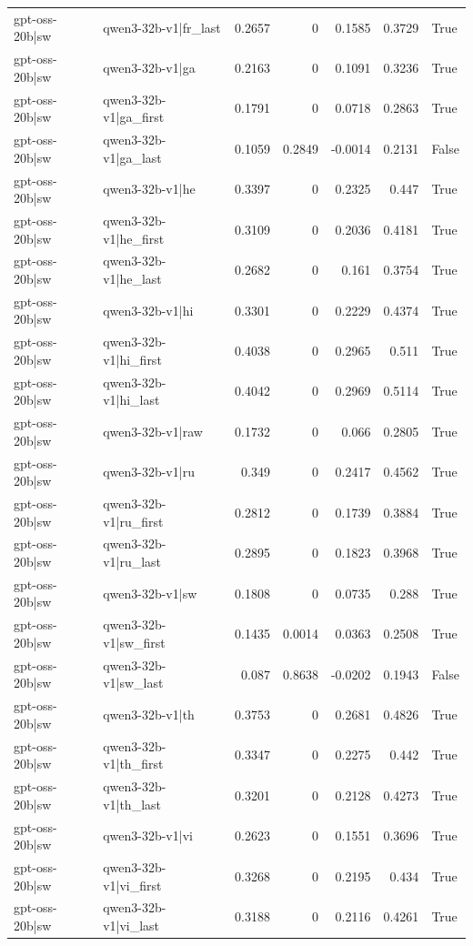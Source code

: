 \begin{table}
\begin{tabular}{l l r r r r l}
gpt-oss-20b|sw & qwen3-32b-v1|fr_last & 0.2657 & 0 & 0.1585 & 0.3729 & True \\
gpt-oss-20b|sw & qwen3-32b-v1|ga & 0.2163 & 0 & 0.1091 & 0.3236 & True \\
gpt-oss-20b|sw & qwen3-32b-v1|ga_first & 0.1791 & 0 & 0.0718 & 0.2863 & True \\
gpt-oss-20b|sw & qwen3-32b-v1|ga_last & 0.1059 & 0.2849 & -0.0014 & 0.2131 & False \\
gpt-oss-20b|sw & qwen3-32b-v1|he & 0.3397 & 0 & 0.2325 & 0.447 & True \\
gpt-oss-20b|sw & qwen3-32b-v1|he_first & 0.3109 & 0 & 0.2036 & 0.4181 & True \\
gpt-oss-20b|sw & qwen3-32b-v1|he_last & 0.2682 & 0 & 0.161 & 0.3754 & True \\
gpt-oss-20b|sw & qwen3-32b-v1|hi & 0.3301 & 0 & 0.2229 & 0.4374 & True \\
gpt-oss-20b|sw & qwen3-32b-v1|hi_first & 0.4038 & 0 & 0.2965 & 0.511 & True \\
gpt-oss-20b|sw & qwen3-32b-v1|hi_last & 0.4042 & 0 & 0.2969 & 0.5114 & True \\
gpt-oss-20b|sw & qwen3-32b-v1|raw & 0.1732 & 0 & 0.066 & 0.2805 & True \\
gpt-oss-20b|sw & qwen3-32b-v1|ru & 0.349 & 0 & 0.2417 & 0.4562 & True \\
gpt-oss-20b|sw & qwen3-32b-v1|ru_first & 0.2812 & 0 & 0.1739 & 0.3884 & True \\
gpt-oss-20b|sw & qwen3-32b-v1|ru_last & 0.2895 & 0 & 0.1823 & 0.3968 & True \\
gpt-oss-20b|sw & qwen3-32b-v1|sw & 0.1808 & 0 & 0.0735 & 0.288 & True \\
gpt-oss-20b|sw & qwen3-32b-v1|sw_first & 0.1435 & 0.0014 & 0.0363 & 0.2508 & True \\
gpt-oss-20b|sw & qwen3-32b-v1|sw_last & 0.087 & 0.8638 & -0.0202 & 0.1943 & False \\
gpt-oss-20b|sw & qwen3-32b-v1|th & 0.3753 & 0 & 0.2681 & 0.4826 & True \\
gpt-oss-20b|sw & qwen3-32b-v1|th_first & 0.3347 & 0 & 0.2275 & 0.442 & True \\
gpt-oss-20b|sw & qwen3-32b-v1|th_last & 0.3201 & 0 & 0.2128 & 0.4273 & True \\
gpt-oss-20b|sw & qwen3-32b-v1|vi & 0.2623 & 0 & 0.1551 & 0.3696 & True \\
gpt-oss-20b|sw & qwen3-32b-v1|vi_first & 0.3268 & 0 & 0.2195 & 0.434 & True \\
gpt-oss-20b|sw & qwen3-32b-v1|vi_last & 0.3188 & 0 & 0.2116 & 0.4261 & True \\

\end{tabular}
\end{table}
